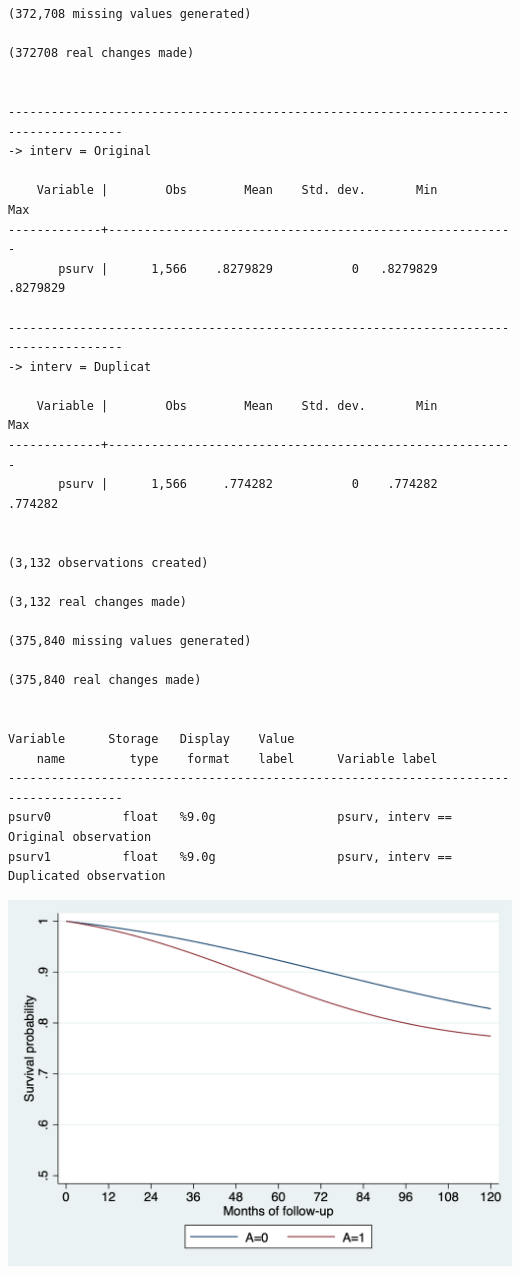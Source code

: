 \documentclass[
  10pt,
  a4paper,
]{book}
\begin{document}
\begin{verbatim}
(372,708 missing values generated)

(372708 real changes made)


--------------------------------------------------------------------------------------
-> interv = Original

    Variable |        Obs        Mean    Std. dev.       Min        Max
-------------+---------------------------------------------------------
       psurv |      1,566    .8279829           0   .8279829   .8279829

--------------------------------------------------------------------------------------
-> interv = Duplicat

    Variable |        Obs        Mean    Std. dev.       Min        Max
-------------+---------------------------------------------------------
       psurv |      1,566     .774282           0    .774282    .774282


(3,132 observations created)

(3,132 real changes made)

(375,840 missing values generated)

(375,840 real changes made)


Variable      Storage   Display    Value
    name         type    format    label      Variable label
--------------------------------------------------------------------------------------
psurv0          float   %9.0g                 psurv, interv == Original observation
psurv1          float   %9.0g                 psurv, interv == Duplicated observation
\end{verbatim}

\begin{center}\includegraphics[width=0.85\linewidth]{./figs/stata-fig-17-2} \end{center}
\end{document}
